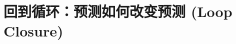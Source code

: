 \documentclass[openany, a4paper, 12pt]{book}
\begin{document}
	\part{回到循环：预测如何改变预测 (Loop Closure)}
	
	

	\appendix
	

	\backmatter
\end{document}
